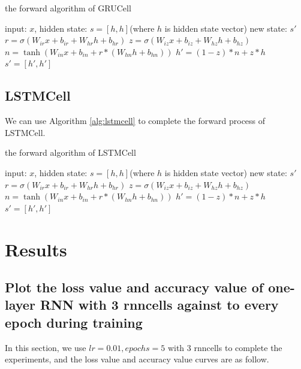 \documentclass{elegantbook}
\begin{document}
\begin{algorithm}[H]
	\caption{\label{alg:grucell}the forward algorithm of GRUCell}
	\begin{algorithmic}[1]
		\Require input: $x$, hidden state: $s=[h, h]$(where $h$ is hidden state vector)
		\Ensure new state: $s'$
		\State $r = \sigma(W_{ir} x + b_{ir} + W_{hr} h + b_{hr})$
		\State $z = \sigma(W_{iz} x + b_{iz} + W_{hz} h + b_{hz})$
		\State $n = \tanh(W_{in} x + b_{in} + r * (W_{hn} h + b_{hn}))$
		\State $h' = (1 - z) * n + z * h$
		\State \Return $s'=[h', h']$
	\end{algorithmic}
\end{algorithm}

\section{LSTMCell}
We can use Algorithm \ref{alg:lstmcell} to complete the forward process of LSTMCell.

\begin{algorithm}[H]
	\caption{\label{alg:lstmcell}the forward algorithm of LSTMCell}
	\begin{algorithmic}[1]
		\Require input: $x$, hidden state: $s=[h, h]$(where $h$ is hidden state vector)
		\Ensure new state: $s'$
		\State $r = \sigma(W_{ir} x + b_{ir} + W_{hr} h + b_{hr})$
		\State $z = \sigma(W_{iz} x + b_{iz} + W_{hz} h + b_{hz})$
		\State $n = \tanh(W_{in} x + b_{in} + r * (W_{hn} h + b_{hn}))$
		\State $h' = (1 - z) * n + z * h$
		\State \Return $s'=[h', h']$
	\end{algorithmic}
\end{algorithm}

\chapter{Results}
\section{Plot the loss value and accuracy value of one-layer RNN with 3 rnncells against to every epoch during training}
In this section, we use $lr=0.01, epochs=5$ with 3 rnncells to complete the experiments, and the loss value and accuracy value curves are as follow.
\end{document}

